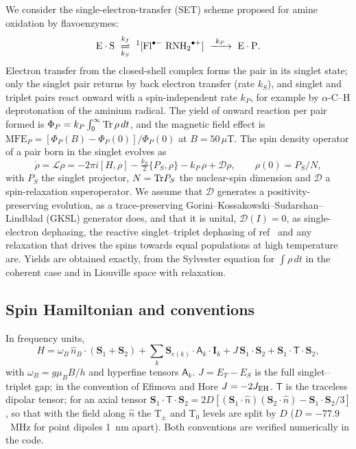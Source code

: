 \documentclass[journal=jpcbfk,manuscript=article,layout=traditional]{achemso}
\begin{document}
We consider the single-electron-transfer (SET) scheme proposed for amine
oxidation by flavoenzymes:\cite{Edmondson2007}
\begin{equation}
{\rm E\cdot S}\ \underset{k_S}{\overset{k_f}{\rightleftharpoons}}\
{}^1[{\rm Fl}^{\bullet-}\ {\rm RNH_2}^{\bullet+}]
\ \xrightarrow{\ k_P\ }\ {\rm E\cdot P}.
\label{eq:scheme}
\end{equation}
Electron transfer from the closed-shell complex forms the pair in its singlet
state; only the singlet pair returns by back electron transfer (rate $k_S$), and
singlet and triplet pairs react onward with a spin-independent rate $k_P$, for
example by $\alpha$-C--H deprotonation of the aminium radical. The yield of
onward reaction per pair formed is $\Phi_P = k_P\int_0^\infty{\rm Tr}\,\rho\,dt$,
and the magnetic field effect is
$\mathrm{MFE}_P = [\Phi_P(B)-\Phi_P(0)]/\Phi_P(0)$ at $B=50\,\mu$T. The spin
density operator of a pair born in the singlet evolves as
\begin{equation}
\dot\rho = \mathcal L\rho = -2\pi i[H,\rho] - \tfrac{k_S}{2}\{P_S,\rho\} - k_P\,\rho
+ \mathcal D\rho ,
\qquad \rho(0) = P_S/N ,
\label{eq:me}
\end{equation}
with $P_S$ the singlet projector, $N = {\rm Tr}P_S$ the nuclear-spin dimension and
$\mathcal D$ a spin-relaxation superoperator. We assume that $\mathcal D$
generates a positivity-preserving evolution, as a trace-preserving
Gorini--Kossakowski--Sudarshan--Lindblad (GKSL) generator does, and that it is
unital, $\mathcal D(I)=0$, as single-electron dephasing, the reactive
singlet--triplet dephasing of ref~\citenum{Fay2018} and any relaxation that
drives the spins towards equal populations at high temperature are. Yields are
obtained exactly, from the Sylvester equation for $\int\rho\,dt$ in the coherent
case and in Liouville space with relaxation.

\subsection{Spin Hamiltonian and conventions}

In frequency units,
\begin{equation}
H = \omega_B\,\hat n_B\!\cdot(\mathbf S_1+\mathbf S_2)
  + \sum_k \mathbf S_{e(k)}\!\cdot\mathsf A_k\cdot\mathbf I_k
  + J\,\mathbf S_1\!\cdot\!\mathbf S_2
  + \mathbf S_1\!\cdot\mathsf T\cdot\mathbf S_2 ,
\label{eq:H}
\end{equation}
with $\omega_B = g\mu_BB/h$ and hyperfine tensors $\mathsf A_k$. $J = E_T - E_S$
is the full singlet--triplet gap; in the convention of Efimova and
Hore\cite{Efimova2008} $J = -2J_{\rm EH}$. $\mathsf T$ is the traceless dipolar
tensor; for an axial tensor
$\mathbf S_1\!\cdot\mathsf T\cdot\mathbf S_2 =
2D[(\mathbf S_1\!\cdot\hat n)(\mathbf S_2\!\cdot\hat n) - \mathbf S_1\!\cdot\mathbf S_2/3]$,
so that with the field along $\hat n$ the T$_\pm$ and T$_0$ levels are split by
$D$ ($D = -77.9$~MHz for point dipoles 1~nm apart\cite{Efimova2008}). Both
conventions are verified numerically in the code.
\end{document}
